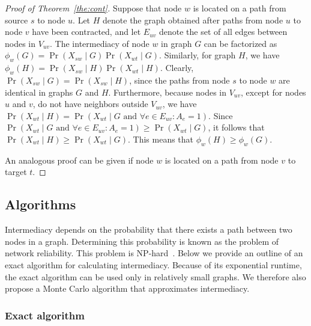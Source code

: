 \documentclass[9pt,twocolumn,twoside]{pnas-alt} %
\theoremstyle{definition}
\newcommand{\theref}[1]{Theorem~\ref{the:#1}\xspace}
\begin{document}
{\begin{proof}[Proof of \theref{cont}]
    Suppose that node $w$ is located on a path from source $s$ to node $u$. Let $H$ denote the graph obtained after paths from node $u$ to node $v$ have been contracted, and let $E_{uv}$ denote the set of all edges between nodes in $V_{uv}$. The intermediacy of node $w$ in graph $G$ can be factorized as $\phi_w(G) = \Pr(X_{sw} \mid G)\Pr(X_{wt} \mid G)$. Similarly, for graph $H$, we have $\phi_w(H) = \Pr(X_{sw} \mid H)\Pr(X_{wt} \mid H)$. Clearly, $\Pr(X_{sw} \mid G) = \Pr(X_{sw} \mid H)$, since the paths from node $s$ to node $w$ are identical in graphs $G$ and $H$. Furthermore, because nodes in $V_{uv}$, except for nodes $u$ and $v$, do not have neighbors outside $V_{uv}$, we have $\Pr(X_{wt} \mid H) = \Pr(X_{wt} \mid G \text{~and~} \forall e \in E_{uv}\!:\!A_e = 1)$. Since $\Pr(X_{wt} \mid G \text{~and~} \forall e \in E_{uv}\!:\!A_e = 1) \geq \Pr(X_{wt} \mid G)$, it follows that $\Pr(X_{wt} \mid H) \geq \Pr(X_{wt} \mid G)$. This means that $\phi_w(H) \geq \phi_w(G)$.

    An analogous proof can be given if node $w$ is located on a path from node $v$ to target $t$.
\end{proof}

%
%

\subsection*{\label{sec:algorithms}Algorithms}

Intermediacy depends on the probability that there exists a path between two nodes in a graph. Determining this probability is known as the problem of network reliability. This problem is NP-hard~\cite{Ball1980}. Below we provide an outline of an exact algorithm for calculating intermediacy. Because of its exponential runtime, the exact algorithm can be used only in relatively small graphs. We therefore also propose a Monte Carlo algorithm that approximates intermediacy.

\subsubsection*{\label{sec:algorithm}Exact algorithm}

}
\end{document}
